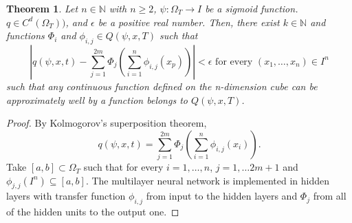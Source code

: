 \documentclass{article}
\newtheorem{theorem}{Theorem}[section]
\begin{document}
\begin{theorem}  \label{nn_proof}
	Let $n \in \mathbb{N}$ with $n \geq 2$, $\psi: \Omega_{T} \rightarrow \textit{I}$ be a sigmoid function. $q \in C^{d}(\Omega_{T}))$, and $\epsilon$ be a positive real number. 
Then, there exist $k \in \mathbb{N}$ and functions $\Phi_{i}$ and $\phi_{i,j} \in Q(\psi,x,T)$ such that
	\begin{equation}
	\left|q(\psi,x,t)-\sum_{j=1}^{2m}\Phi_{j}\left(\sum_{i=1}^{n}\phi_{i,j}(x_p)\right)\right| < \epsilon \text{ for every } (x_1, \dots, x_n) \in I^{n}
	\end{equation}
	such that any continuous function defined on the n-dimension cube can be approximately well by a function belongs to $Q(\psi,x,T)$.

\end{theorem}
\begin{proof}

    By Kolmogorov's superposition theorem,
    \[q(\psi,x,t)=\sum_{j=1}^{2m}\Phi_{j}\left(\sum_{i=1}^{n}\phi_{i,j}(x_i)\right).\]
    Take $[a,b] \subset \Omega_{T}$ such that for every $i=1,\dots,n$, $j=1, \dots 2m+1$ and $\phi_{j,j}(\textit{I}^{n})\subseteq [a,b]$.
    The multilayer neural network is implemented in hidden layers with transfer function $\phi_{i,j}$ from input to the hidden layers and $\Phi_j$ from all of the hidden units to the output one.



\end{proof}
\end{document}
